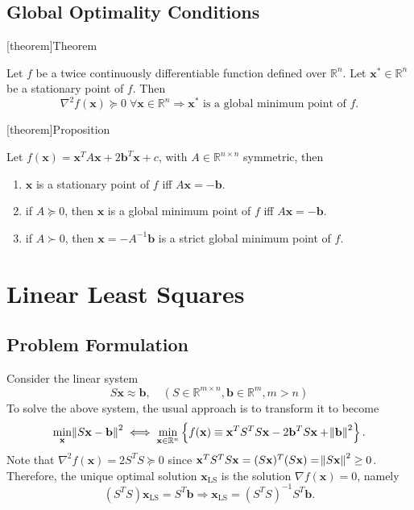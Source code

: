 \documentclass[12pt]{report}
\theoremstyle{definition}
\begin{document}
\section{Global Optimality Conditions}

[theorem]{Theorem}
\begin{global optimality condition}
    Let $f$ be a twice continuously differentiable function defined over
    $\mathbb{R}^{n}$.
    Let $\mathbf{x}^*\in\mathbb{R}^{n}$ be a
    stationary point of $f$. Then
    \[
        \nabla^2 f(\mathbf{x})\succeq 0\;\forall \mathbf{x}\in\mathbb{R}^{n}
        \Longrightarrow
        \mathbf{x}^* \text{ is a global minimum point of $f$}.
    \]
\end{global optimality condition}

[theorem]{Proposition}
\begin{quadratic function optimality}
    Let $f(\mathbf{x})=\mathbf{x}^TA\mathbf{x}+2\mathbf{b}^T\mathbf{x}+c$, with
    $A\in\mathbb{R}^{n\times n}$ symmetric, then
    \begin{enumerate}
        \item $\mathbf{x}$ is a stationary point of $f$ iff
            $A\mathbf{x}=-\mathbf{b}$.
        \item if $A\succeq 0$, then $\mathbf{x}$ is a global minimum point of
            $f$ iff $A\mathbf{x}=-\mathbf{b}$.
        \item if $A\succ 0$, then $\mathbf{x}=-A^{-1}\mathbf{b}$ is a strict
            global minimum point of $f$.
    \end{enumerate} 
\end{quadratic function optimality}


\chapter{Linear Least Squares}

\section{Problem Formulation}

Consider the linear system
\[
    S\mathbf{x}\approx\mathbf{b},\quad(S\in\mathbb{R}^{m\times
    n},\mathbf{b}\in\mathbb{R}^{m},m>n)
\]
To solve the above system, the usual approach is to transform it to become
\[
    \underset{\mathbf{x}}{\text{min}}\norm{S\mathbf{x}-\mathbf{b}}^2
    \iff
    \underset{\mathbf{x}\in\mathbb{R}^{n}}{\text{min}}
    \left\{f(\mathbf{x})\equiv
    \mathbf{x}^TS^TS\mathbf{x}-2\mathbf{b}^TS\mathbf{x}+\norm{\mathbf{b}}^2\right\}.
\]
Note that $\nabla^2f(\mathbf{x})=2S^TS\succeq 0$ since
$\mathbf{x}^TS^TS\mathbf{x}=(S\mathbf{x})^T(S\mathbf{x})=\norm{S\mathbf{x}}^2\ge 0$.
Therefore, the unique optimal solution $\mathbf{x}_\text{LS}$ is the solution
$\nabla f(\mathbf{x})=0$, namely
\[
    (S^TS)\mathbf{x}_\text{LS}=S^T\mathbf{b} \Longrightarrow
    \mathbf{x}_\text{LS}={(S^TS)}^{-1}S^T\mathbf{b}.
\]
\end{document}
